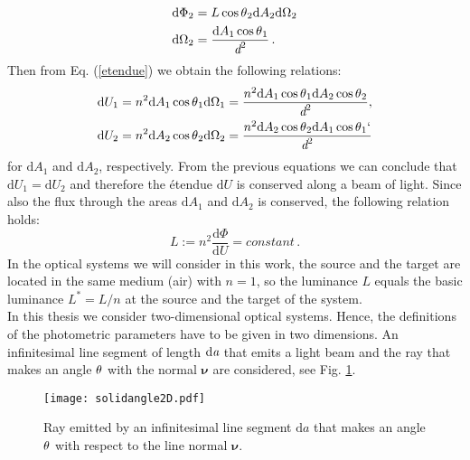 \begin{equation}\begin{split}
\textrm{d}\Phi_2 &= L \cos\mbox{$\theta$}_2 \textrm{d}A_2 \textrm{d}\Omega_2\\
\textrm{d}\Omega_2 &= \frac{\textrm{d}A_1\cos\mbox{$\theta$}_1}{\textit{d}^2}\,.
\end{split}
\end{equation}
Then from Eq. (\ref{etendue}) we obtain the following relations: \begin{equation}
\begin{split}
\textrm{d}U_1 &= n^2 \textrm{d}A_1\cos\mbox{$\theta$}_1\textrm{d}\Omega_1= \frac{n^2 \textrm{d}A_1\cos\mbox{$\theta$}_1\textrm{d}A_2\cos\mbox{$\theta$}_2}{\textit{d}^2},\\
\textrm{d}U_2 &= n^2 \textrm{d}A_2\cos\mbox{$\theta$}_2\textrm{d}\Omega_2= \frac{ n^2 \textrm{d}A_2\cos\mbox{$\theta$}_2\textrm{d}A_1\cos\mbox{$\theta$}_1	`}{\textit{d}^2}
\end{split}
\end{equation}
for $\textrm{d}A_1$ and $\textrm{d}A_2$, respectively.
From the previous equations we can conclude that $\textrm{d}U_1=\textrm{d}U_2$ and therefore the \'{e}tendue $\textrm{d}U$ is conserved along a beam of light. 
Since also the flux through the areas $\textrm{d}A_1$ and $\textrm{d}A_2$ is conserved, the following relation holds:
\begin{equation}\label{basicluminance}
L := n^2 \frac{\textrm{d}\Phi}{\textrm{d}U} = constant\,.
\end{equation}
 In the optical systems we will consider in this work, the source and the target are located in the same medium (air) with $n=1$, so the luminance $L$ equals the basic luminance $L^* = L/n$ at the source and the target of the system.\\
\indent In this thesis we consider two-dimensional optical systems. 
 Hence, the definitions of the photometric parameters have to be given in two dimensions. An infinitesimal line segment of length $\textrm{d}\textit{a}$ that emits a light beam and the ray that makes an angle $\mbox{$\theta$}$ with the normal $\boldsymbol{\nu}$ are considered, see Fig. \ref{fig:2Dsolidangle}. 
\begin{figure}[h]
 \label{fig:2Dsolidangle}
     \begin{center}
     \texttt{[image: solidangle2D.pdf]}
     \end{center}
     \caption{Ray emitted by an infinitesimal line segment $\textrm{d}a$ that makes an angle $\mbox{$\theta$}$ with respect to the line normal $\boldsymbol{\nu}$.}
\label{fig:2Dsolidangle}
 \end{figure}




